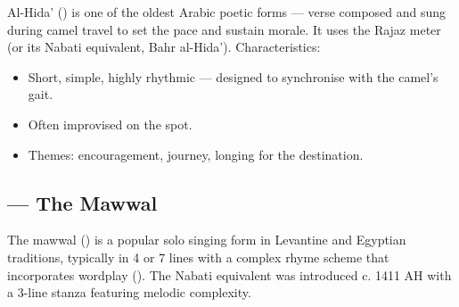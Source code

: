 Al-Hida' () is one of the oldest Arabic poetic forms — verse composed and sung during camel travel to set the pace and sustain morale. It uses the Rajaz meter (or its Nabati equivalent, Bahr al-Hida'). Characteristics:
\begin{itemize}
  \item Short, simple, highly rhythmic — designed to synchronise with the camel's gait.
  \item Often improvised on the spot.
  \item Themes: encouragement, journey, longing for the destination.
\end{itemize}

\subsection{ — The Mawwal}

The mawwal () is a popular solo singing form in Levantine and Egyptian traditions, typically in 4 or 7 lines with a complex rhyme scheme that incorporates wordplay (). The Nabati equivalent was introduced c. 1411 AH with a 3-line stanza featuring melodic complexity.

\clearpage
\langsep{}

